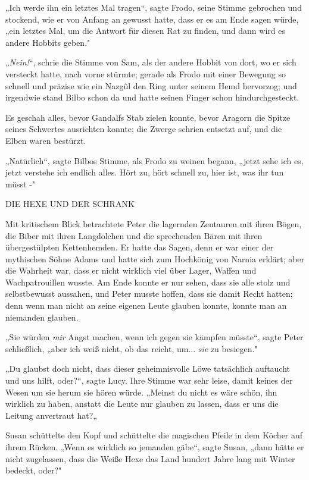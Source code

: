 {„Ich werde ihn ein letztes Mal tragen“, sagte Frodo, seine Stimme gebrochen und stockend, wie er von Anfang an gewusst hatte, dass er es am Ende sagen würde, „ein letztes Mal, um die Antwort für diesen Rat zu finden, und dann wird es andere Hobbits geben."

„\emph{Nein!}“, schrie die Stimme von Sam, als der andere Hobbit von dort, wo er sich versteckt hatte, nach vorne stürmte; gerade als Frodo mit einer Bewegung so schnell und präzise wie ein Nazgûl den Ring unter seinem Hemd hervorzog; und irgendwie stand Bilbo schon da und hatte seinen Finger schon hindurchgesteckt.

Es geschah alles, bevor Gandalfs Stab zielen konnte, bevor Aragorn die Spitze seines Schwertes ausrichten konnte; die Zwerge schrien entsetzt auf, und die Elben waren bestürzt.

„Natürlich“, sagte Bilbos Stimme, als Frodo zu weinen begann, „jetzt sehe ich es, jetzt verstehe ich endlich alles. Hört zu, hört schnell zu, hier ist, was ihr tun müsst -"

DIE HEXE UND DER SCHRANK

Mit kritischem Blick betrachtete Peter die lagernden Zentauren mit ihren Bögen, die Biber mit ihren Langdolchen und die sprechenden Bären mit ihren übergestülpten Kettenhemden. Er hatte das Sagen, denn er war einer der mythischen Söhne Adams und hatte sich zum Hochkönig von Narnia erklärt; aber die Wahrheit war, dass er nicht wirklich viel über Lager, Waffen und Wachpatrouillen wusste. Am Ende konnte er nur sehen, dass sie alle stolz und selbstbewusst aussahen, und Peter musste hoffen, dass sie damit Recht hatten; denn wenn man nicht an seine eigenen Leute glauben konnte, konnte man an niemanden glauben.

„Sie würden \emph{mir} Angst machen, wenn ich gegen sie kämpfen müsste“, sagte Peter schließlich, „aber ich weiß nicht, ob das reicht, um... \emph{sie} zu besiegen."

„Du glaubst doch nicht, dass dieser geheimnisvolle Löwe tatsächlich auftaucht und uns hilft, oder?“, sagte Lucy. Ihre Stimme war sehr leise, damit keines der Wesen um sie herum sie hören würde. „Meinst du nicht es wäre schön, ihn wirklich zu haben, anstatt die Leute nur glauben zu lassen, dass er uns die Leitung anvertraut hat?„

Susan schüttelte den Kopf und schüttelte die magischen Pfeile in dem Köcher auf ihrem Rücken. „Wenn es wirklich so jemanden gäbe“, sagte Susan, „dann hätte er nicht zugelassen, dass die Weiße Hexe das Land hundert Jahre lang mit Winter bedeckt, oder?"

}
